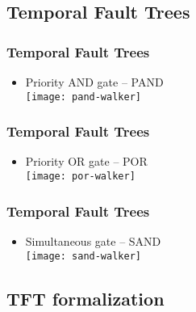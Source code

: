 \subsection{Temporal Fault Trees}

\begin{frame}
\frametitle{Temporal Fault Trees}
\begin{itemize}
  \item Priority AND gate -- PAND\\
  \texttt{[image: pand-walker]}
\end{itemize}
\end{frame}

\begin{frame}
\frametitle{Temporal Fault Trees}
\begin{itemize}
  \item Priority OR gate -- POR\\
  \texttt{[image: por-walker]}
\end{itemize}
\end{frame}

\begin{frame}
\frametitle{Temporal Fault Trees}
\begin{itemize}
  \item Simultaneous gate -- SAND\\
  \texttt{[image: sand-walker]}
\end{itemize}
\end{frame}

\subsection{TFT formalization}

